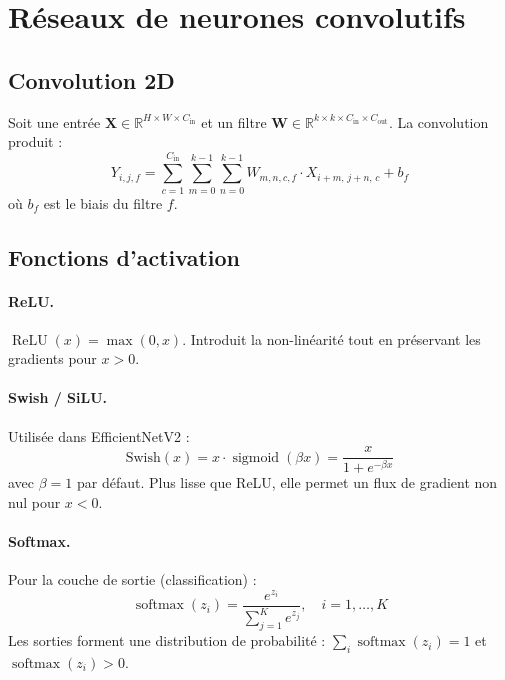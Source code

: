 \documentclass[11pt,a4paper]{article}
\newcommand{\R}{\mathbb{R}}
\DeclareMathOperator{\softmax}{softmax}
\DeclareMathOperator{\sigmoid}{sigmoid}
\DeclareMathOperator{\ReLU}{ReLU}
\begin{document}
\section{Réseaux de neurones convolutifs}

\subsection{Convolution 2D}

\begin{defbox}
Soit une entrée $\mathbf{X} \in \R^{H \times W \times C_{\text{in}}}$ et un filtre $\mathbf{W} \in \R^{k \times k \times C_{\text{in}} \times C_{\text{out}}}$. La convolution produit :
\begin{equation}
  Y_{i,j,f} = \sum_{c=1}^{C_{\text{in}}} \sum_{m=0}^{k-1} \sum_{n=0}^{k-1} W_{m,n,c,f} \cdot X_{i+m,\,j+n,\,c} + b_f
\end{equation}
où $b_f$ est le biais du filtre $f$.
\end{defbox}

\subsection{Fonctions d'activation}

\paragraph{ReLU.} $\ReLU(x) = \max(0, x)$. Introduit la non-linéarité tout en préservant les gradients pour $x > 0$.

\paragraph{Swish / SiLU.} Utilisée dans EfficientNetV2 :
\begin{equation}
  \text{Swish}(x) = x \cdot \sigmoid(\beta x) = \frac{x}{1 + e^{-\beta x}}
\end{equation}
avec $\beta = 1$ par défaut. Plus lisse que ReLU, elle permet un flux de gradient non nul pour $x < 0$.

\paragraph{Softmax.} Pour la couche de sortie (classification) :
\begin{equation}
  \softmax(z_i) = \frac{e^{z_i}}{\sum_{j=1}^{K} e^{z_j}}, \quad i = 1, \ldots, K
\end{equation}
Les sorties forment une distribution de probabilité : $\sum_i \softmax(z_i) = 1$ et $\softmax(z_i) > 0$.
\end{document}
